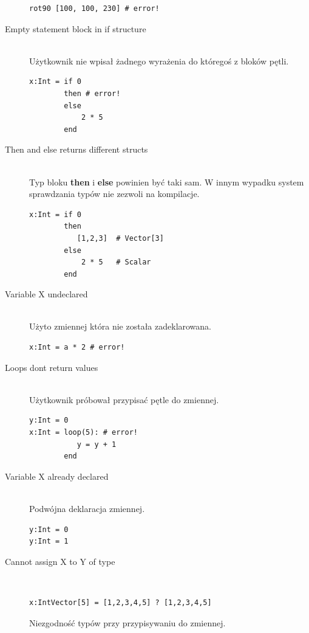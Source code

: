 \begin{description}
\begin{lstlisting}[frame=single]
rot90 [100, 100, 230] # error!
\end{lstlisting}       
  \item[Empty statement block in if structure] \hfill \\
      Użytkownik nie wpisał żadnego wyrażenia do któregoś z bloków pętli.
\begin{lstlisting}[frame=single]
x:Int = if 0
        then # error!
        else
            2 * 5
        end
\end{lstlisting}        
  \item[Then and else returns different structs] \hfill \\
       Typ bloku \textbf{then} i \textbf{else} powinien być taki sam. W innym wypadku system sprawdzania typów nie zezwoli na kompilacje.
\begin{lstlisting}[frame=single]
x:Int = if 0
        then 
           [1,2,3]  # Vector[3]
        else
            2 * 5   # Scalar
        end
\end{lstlisting}   
  \item[Variable X undeclared] \hfill \\
      Użyto zmiennej która nie została zadeklarowana.
\begin{lstlisting}[frame=single]
x:Int = a * 2 # error!
\end{lstlisting}   
  \item[Loops dont return values] \hfill \\
     Użytkownik próbował przypisać pętle do zmiennej.
\begin{lstlisting}[frame=single]
y:Int = 0
x:Int = loop(5): # error!
           y = y + 1
        end  
\end{lstlisting} 
  \item[Variable X already declared] \hfill \\
      Podwójna deklaracja zmiennej.
      \begin{lstlisting}[frame=single]
y:Int = 0
y:Int = 1
\end{lstlisting} 
  \item[Cannot assign X to Y of type]\hfill \\
    \begin{lstlisting}[frame=single]
x:IntVector[5] = [1,2,3,4,5] ? [1,2,3,4,5]
\end{lstlisting} 
  Niezgodność typów przy przypisywaniu do zmiennej.

\end{description}


